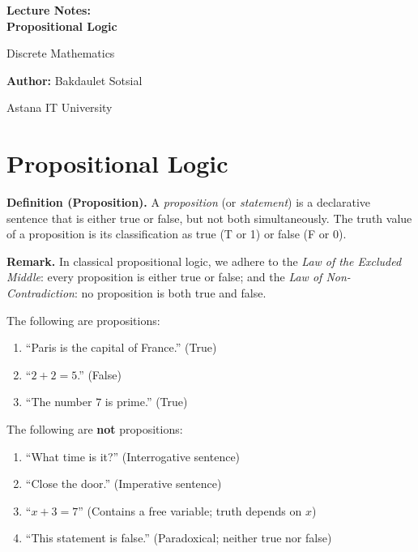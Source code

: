 \documentclass[11pt,a4paper]{article}
\begin{document}
\begin{titlepage}
    \centering
    \vspace*{4cm}
    
    {\Huge\bfseries Lecture Notes:\\ Propositional Logic\par}
    \vspace{1cm}
    {\Large Discrete Mathematics\par}
    \vspace{2cm}
    {\large \textbf{Author:} Bakdaulet Sotsial\par}
    \vspace{1cm}
    
    \vfill
    {\small Astana IT University \par}
    \vspace*{2cm}
\end{titlepage}

\tableofcontents
\newpage

\section{Propositional Logic}

\textbf{Definition (Proposition).} A \textit{proposition} (or \textit{statement}) is a declarative sentence that is either true or false, but not both simultaneously. The truth value of a proposition is its classification as true (T or 1) or false (F or 0).

\textbf{Remark.} In classical propositional logic, we adhere to the \textit{Law of the Excluded Middle}: every proposition is either true or false; and the \textit{Law of Non-Contradiction}: no proposition is both true and false.

\begin{example}
The following are propositions:
\begin{enumerate}[label=(\arabic*)]
    \item ``Paris is the capital of France.'' (True)
    \item ``$2 + 2 = 5$.'' (False)
    \item ``The number $7$ is prime.'' (True)
\end{enumerate}
\end{example}

\begin{example}
The following are \textbf{not} propositions:
\begin{enumerate}[label=(\arabic*)]
    \item ``What time is it?'' (Interrogative sentence)
    \item ``Close the door.'' (Imperative sentence)
    \item ``$x + 3 = 7$'' (Contains a free variable; truth depends on $x$)
    \item ``This statement is false.'' (Paradoxical; neither true nor false)
\end{enumerate}
\end{example}
\end{document}
